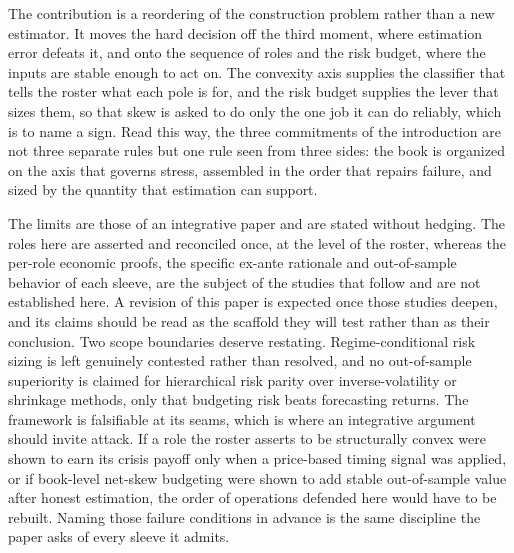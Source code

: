 \documentclass[12pt, a4paper]{article}
\begin{document}
The contribution is a reordering of the construction problem rather than
a new estimator. It moves the hard decision off the third moment, where
estimation error defeats it, and onto the sequence of roles and the risk
budget, where the inputs are stable enough to act on. The convexity axis
supplies the classifier that tells the roster what each pole is for, and
the risk budget supplies the lever that sizes them, so that skew is
asked to do only the one job it can do reliably, which is to name a
sign. Read this way, the three commitments of the introduction are not
three separate rules but one rule seen from three sides: the book is
organized on the axis that governs stress, assembled in the order that
repairs failure, and sized by the quantity that estimation can support.

The limits are those of an integrative paper and are stated without
hedging. The roles here are asserted and reconciled once, at the level
of the roster, whereas the per-role economic proofs, the specific
ex-ante rationale and out-of-sample behavior of each sleeve, are the
subject of the studies that follow and are not established here. A
revision of this paper is expected once those studies deepen, and its
claims should be read as the scaffold they will test rather than as
their conclusion. Two scope boundaries deserve restating.
Regime-conditional risk sizing is left genuinely contested rather than
resolved, and no out-of-sample superiority is claimed for hierarchical
risk parity over inverse-volatility or shrinkage methods, only that
budgeting risk beats forecasting returns. The framework is falsifiable
at its seams, which is where an integrative argument should invite
attack. If a role the roster asserts to be structurally convex were
shown to earn its crisis payoff only when a price-based timing signal
was applied, or if book-level net-skew budgeting were shown to add
stable out-of-sample value after honest estimation, the order of
operations defended here would have to be rebuilt. Naming those failure
conditions in advance is the same discipline the paper asks of every
sleeve it admits.
\end{document}
